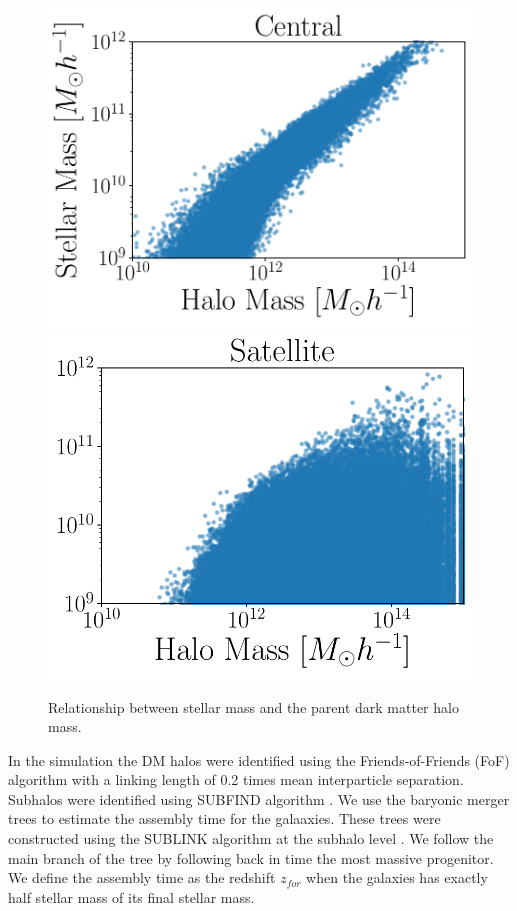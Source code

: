 \documentclass[a4paper,fleqn,usenatbib]{mnras}
\begin{document}
\begin{figure}
    \centering
     \includegraphics[width=1\columnwidth]{figuras/CH.pdf}
    \includegraphics[width=0.9\columnwidth]{figuras/SH.pdf}
    \caption{Relationship between stellar mass and the parent dark matter halo mass.}
    \label{fig:stellar_to_halo}
\end{figure}



In the simulation the DM halos were identified using the
Friends-of-Friends (FoF) algorithm with a linking length of 0.2 times
mean interparticle separation. 
Subhalos were identified using SUBFIND algorithm
\citep{2015MNAS.449...49R}. 
We use the baryonic merger trees to estimate the assembly time for the
galaaxies.
These trees were constructed using the SUBLINK algorithm at the
subhalo level \citep{2015MNRAS.449...49R}.
We follow the main branch of the tree by following back in time the
most massive progenitor.
We define the assembly time as the redshift $z_{for}$ when the
galaxies has exactly half stellar mass of its final stellar mass. 
\end{document}
